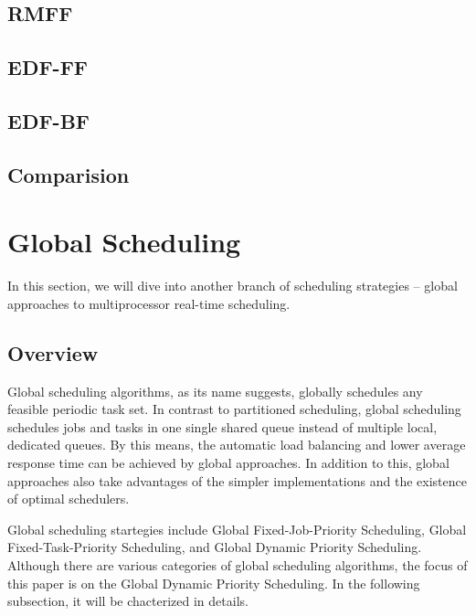 \documentclass[preprint,12pt]{elsarticle}
\begin{document}
\subsection{RMFF}
\subsection{EDF-FF}
\subsection{EDF-BF}
\subsection{Comparision}

\newpage
\section{Global Scheduling} \label{S:3}
In this section, we will dive into another branch of scheduling strategies --
global approaches to multiprocessor real-time scheduling.

\subsection{Overview}
Global scheduling algorithms, as its name suggests, globally schedules any
feasible periodic task set. In contrast to partitioned scheduling, global
scheduling schedules jobs and tasks in one single shared queue instead of
multiple local, dedicated queues. By this means, the automatic load balancing
and lower average response time can be achieved by global approaches. In
addition to this, global approaches also take advantages of the simpler
implementations and the existence of optimal schedulers. 

Global scheduling startegies include Global Fixed-Job-Priority Scheduling,
Global Fixed-Task-Priority Scheduling, and Global Dynamic Priority Scheduling. 
Although there are various categories of global scheduling algorithms, the
focus of this paper is on the Global Dynamic Priority Scheduling. In the
following subsection, it will be chacterized in details. 
\end{document}
